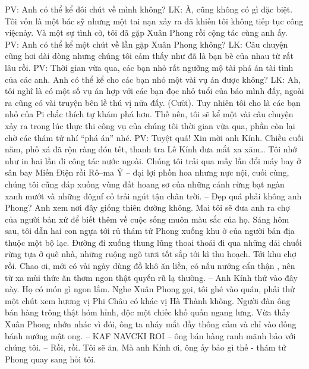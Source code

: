 	\vskip 0.1cm
	PV: Anh có thể kể đôi chút về mình không?
	\vskip 0.1cm
	LK: À, cũng không có gì đặc biệt. Tôi vốn là một bác sỹ nhưng một tai nạn xảy ra đã khiến tôi không tiếp tục công việcnày. Và một sự tình cờ, tôi đã gặp Xuân Phong rồi  cộng tác cùng anh ấy. 
	\vskip 0.1cm
	PV: Anh có thể kể một chút về lần gặp Xuân Phong không?
	\vskip 0.1cm
	LK: Câu chuyện cũng hơi dài dòng nhưng chúng tôi cảm thấy như đã là bạn bè của nhau từ rất lâu rồi.
	\vskip 0.1cm
	PV: Thời gian vừa qua,  các bạn nhỏ rất ngưỡng mộ tài phá án tài tình của các anh. Anh có thể kể cho các bạn nhỏ một vài vụ án được không?
	\vskip 0.1cm
	LK: Ah, tôi  nghĩ là có một số vụ án hợp với các bạn đọc nhỏ tuổi của báo mình đấy, ngoài ra cũng có  vài truyện bên lề  thú vị nữa đấy. (Cười). Tuy nhiên tôi cho là các bạn nhỏ của Pi chắc thích tự khám phá hơn. Thế nên, tôi sẽ kể một vài câu chuyện xảy ra trong lúc thực thi công vụ của chúng tôi thời gian vừa qua, phần còn lại chờ các thám tử nhí “phá án” nhé.
	\vskip 0.1cm
	PV: Tuyệt quá! Xin mời anh Kính.
	\vskip 0.1cm
	Chiều cuối năm, phố xá đã rộn ràng đón tết, thanh tra Lê Kính đưa mắt xa xăm…
	Tôi nhớ như in hai lần đi công tác nước ngoài.
	\vskip 0.1cm
	\newpage
	\textbf{\color{toancuabi}{THỔ NGỮ CHÂU PHI} } %
	\vskip 0.1cm 
	Chúng tôi trải qua mấy lần đổi máy bay ở sân bay Miến Điện rồi Rô--ma Ý -- đại lợi phồn hoa nhưng nực nội, cuối cùng, chúng tôi cũng đáp xuống vùng đất hoang sơ của những cánh rừng bạt ngàn xanh mướt và những đôgnf cỏ trải ngút tận chân trời. 
	\vskip 0.1cm
	-- Đẹp quá phải không anh Phong? Anh xem nơi đây giống thiên đường không. Mai tôi sẽ đưa anh ra chợ của người bản xứ để biết thêm về cuộc sống muôn màu sắc của họ. 
	\vskip 0.1cm
	Sáng hôm sau, tôi dẫn hai con ngựa tới rủ thám tử Phong xuống khu ở của người bản địa thuộc một bộ lạc. Đường đi xuống thung lũng thoai thoải đi qua những dải chuối rừng tựa ở quê nhà, những ruộng ngô tươi tốt sắp tới kì thu hoạch. Tới khu chợ rồi. Chao ơi, mới có vài ngày dùng đồ khô ăn liền, có nấu nướng cẩn thận , nên từ xa mùi thức ăn thơm ngon thật quyến rũ lạ thường.
	\vskip 0.1cm
	-- Anh Kính thử vào đây này. Họ có món gì ngon lắm.
		\vskip 0.1cm
Nghe Xuân Phong gọi, tôi ghé vào quán, phải thử một chút xem hương vị Phi Châu có khác vị Hà Thành không.
	\vskip 0.1cm
	Người đàn ông bán hàng trông thật hóm hỉnh, độc một chiếc khố quấn ngang lưng. Vừa thấy Xuân Phong nhớn nhác vì đói, ông ta nháy mắt đầy thông cảm và chỉ vào đống bánh nướng mật ong.
	\vskip 0.1cm
	-- KAF NAVCKI ROI -- ông bán hàng ranh mãnh bảo với chúng tôi.
	\vskip 0.1cm
	-- Rồi, rồi. Tôi sẽ ăn. Mà anh Kính ơi, ông ấy bảo gì thế - thám tử Phong quay sang hỏi tôi.
